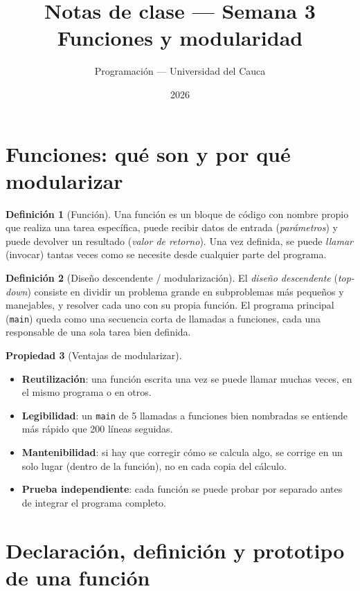 \documentclass[11pt,letterpaper]{article}
\title{\textcolor{unicaucaverde}{\Large Notas de clase --- Semana 3}\\[4pt]
  \large Funciones y modularidad}
\author{Programación --- Universidad del Cauca}
\date{2026}
\theoremstyle{definition}
\newtheorem{definicion}{Definición}[section]
\newtheorem{propiedad}[definicion]{Propiedad}
\begin{document}
\maketitle
\tableofcontents

\section{Funciones: qué son y por qué modularizar}

\begin{definicion}[Función]
Una función es un bloque de código con nombre propio que realiza una tarea específica, puede
recibir datos de entrada (\emph{parámetros}) y puede devolver un resultado (\emph{valor de
retorno}). Una vez definida, se puede \emph{llamar} (invocar) tantas veces como se necesite desde
cualquier parte del programa.
\end{definicion}

\begin{definicion}[Diseño descendente / modularización]
El \emph{diseño descendente} (\emph{top-down}) consiste en dividir un problema grande en
subproblemas más pequeños y manejables, y resolver cada uno con su propia función. El programa
principal (\texttt{main}) queda como una secuencia corta de llamadas a funciones, cada una
responsable de una sola tarea bien definida.
\end{definicion}

\begin{propiedad}[Ventajas de modularizar]
\begin{itemize}[leftmargin=1.2cm]
  \item \textbf{Reutilización}: una función escrita una vez se puede llamar muchas veces, en el
        mismo programa o en otros.
  \item \textbf{Legibilidad}: un \texttt{main} de 5 llamadas a funciones bien nombradas se entiende
        más rápido que 200 líneas seguidas.
  \item \textbf{Mantenibilidad}: si hay que corregir cómo se calcula algo, se corrige en un solo
        lugar (dentro de la función), no en cada copia del cálculo.
  \item \textbf{Prueba independiente}: cada función se puede probar por separado antes de integrar
        el programa completo.
\end{itemize}
\end{propiedad}

\section{Declaración, definición y prototipo de una función}
\end{document}
